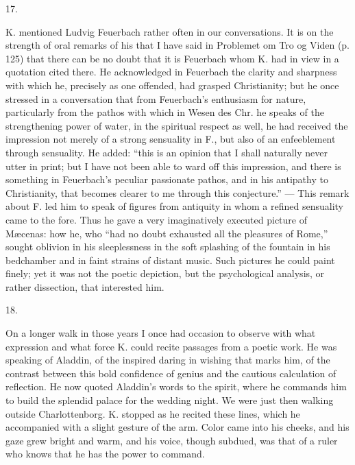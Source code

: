 \documentclass[12pt,a4paper,openany]{book}
\newcommand{\secnum}[1]{\par\begin{center}#1\end{center}\par\nobreak}
\newcommand{\opage}[1]{\marginnote{\footnotesize\textit{[#1]}}}
\begin{document}
\secnum{17.}

K. mentioned Ludvig Feuerbach rather often in our conversations. It is on
the strength of oral remarks of his that I have said in Problemet om Tro
og Viden (p. 125) that there can be no doubt that it is Feuerbach whom K.
had
\opage{350}in view in a quotation cited there. He acknowledged in
Feuerbach the clarity and sharpness with which he, precisely as one
offended, had grasped Christianity; but he once stressed in a conversation
that from Feuerbach's enthusiasm for nature, particularly from the pathos
with which in Wesen des Chr. he speaks of the strengthening power of
water, in the spiritual respect as well, he had received the impression
not merely of a strong sensuality in F., but also of an enfeeblement
through sensuality. He added:
``this is an opinion that I shall naturally never utter in print; but I
have not been able to ward off this impression, and there is something in
Feuerbach's peculiar passionate pathos, and in his antipathy to
Christianity, that becomes clearer to me through this conjecture.''
--- This remark about F. led him to speak of figures from antiquity in
whom a refined sensuality came to the fore. Thus he gave a very
imaginatively executed picture of Mæcenas: how he, who ``had no doubt
exhausted all the pleasures of Rome,'' sought oblivion in his
sleeplessness in the soft splashing of the fountain in his bedchamber and
in faint strains of distant music. Such pictures he could paint finely;
yet it was not the poetic depiction, but the psychological analysis, or
rather dissection, that interested him.

\secnum{18.}

On a longer walk in those years I once had occasion to observe with what
expression and what force K. could recite passages from a poetic work. He
was speaking of Aladdin, of the inspired daring in wishing that marks him,
of the contrast between this bold confidence of genius and the cautious
calculation of reflection. He now quoted Aladdin's words to the spirit,
where he commands him to build the splendid palace for the wedding night.
We were just then walking outside Charlottenborg. K. stopped as he
recited these lines, which he accompanied with
\opage{351}a slight gesture of the arm. Color came into his cheeks, and
his gaze grew bright and warm, and his voice, though subdued, was that of
a ruler who knows that he has the power to command.
\end{document}
